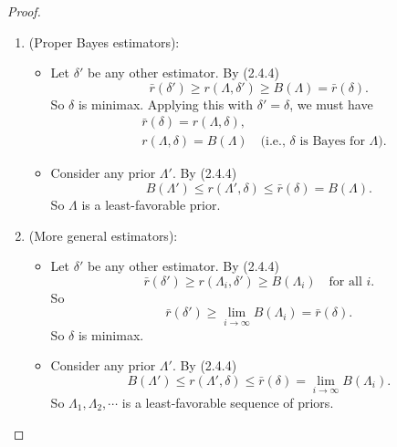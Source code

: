 \documentclass[a4paper]{article}
\begin{document}
\begin{proof}
	\quad
	\begin{enumerate}
		\item (Proper Bayes estimators): 
		\begin{itemize}
			\item Let $\delta'$ be any other estimator. By (2.4.4)
			\begin{equation}
				\bar{r}(\delta') \geq r(\Lambda,\delta') \geq B(\Lambda) = \bar{r}(\delta).
			\end{equation}
			So $\delta$ is minimax. Applying this with $\delta' = \delta$, we must have
			\begin{equation}
				\begin{aligned}
					& \bar{r}(\delta) = r(\Lambda,\delta), \\
					& r(\Lambda,\delta) = B(\Lambda) \quad \text{(i.e., $\delta$ is Bayes for $\Lambda$)}.
				\end{aligned}
			\end{equation}
			\item Consider any prior $\Lambda'$. By (2.4.4)
			\begin{equation}
				B(\Lambda') \leq r(\Lambda',\delta) \leq \bar{r}(\delta) = B(\Lambda).
			\end{equation}
			So $\Lambda$ is a least-favorable prior.
		\end{itemize}
		\item(More general estimators):
		\begin{itemize}
			\item Let $\delta'$ be any other estimator. By (2.4.4)
			\begin{equation}
				\bar{r}(\delta') \geq r(\Lambda_i,\delta') \geq B(\Lambda_i) \quad \text{for all } i.
			\end{equation}
			So
			\begin{equation}
				\bar{r}(\delta') \geq  \lim\limits_{i \to \infty} B(\Lambda_i) = \bar{r}(\delta).
			\end{equation}
			So $\delta$ is minimax.
			\item Consider any prior $\Lambda'$. By (2.4.4)
			\begin{equation}
				B(\Lambda') \leq r(\Lambda',\delta) \leq \bar{r}(\delta) = \lim\limits_{i \to \infty} B(\Lambda_i).
			\end{equation}
			So $\Lambda_1,\Lambda_2,\cdots$ is a least-favorable sequence of priors. 
		\end{itemize}
	\end{enumerate}
\end{proof}
\end{document}
